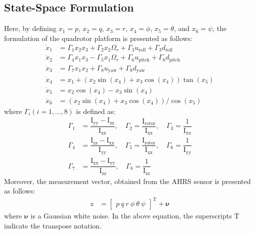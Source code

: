 \documentclass[preprint,12pt,authoryear]{elsarticle}
\begin{document}
\subsection{State-Space Formulation}\label{sec:state-space}
\noindent Here, by defining $x_1 = p$, $x_2 = q$, $x_3 = r$, $x_4 = \phi$, $x_5 = \theta$, and $x_6 = \psi$, the formulation of the quadrotor platform is presented as follows:
\begin{align}\label{eq:diffeq}
	\dot x_1 &= \Gamma_1x_2 x_3 + \Gamma_2 x_2 \Omega_r + \Gamma_3u_{\text{roll}} + \Gamma_3d_{\text{roll}} \\[0.5em]
    \dot x_2 &= \Gamma_4 x_1 x_3 - \Gamma_5 x_1 \Omega_r +  \Gamma_6u_{\text{pitch}} + \Gamma_6d_{\text{pitch}}\\[0.5em] \label{eq:diffeq-mid}
    \dot x_3 &= \Gamma_7x_1 x_2 +  \Gamma_8u_{\text{yaw}} + \Gamma_8d_{\text{yaw}}\\[0.5em] 
    \dot x_4 &= x_1 + (x_2\sin(x_4) + x_3\cos(x_4))\tan(x_5)
    \\[0.5em]
    \dot x_5 &= x_2\cos(x_4) - x_3\sin(x_4)\\[0.5em]
    \dot x_6 &= (x_2\sin(x_4) + x_3\cos(x_4))/\cos(x_5) \label{eq:diffeq-end}
\end{align}
where $\Gamma_i (i = 1, \ldots, 8)$ is defined as:
\begin{equation}
	\begin{split}
		\Gamma_1 &= \dfrac{\mathrm{I}_{\text{yy}} - \mathrm{I}_{\text{zz}}}{\mathrm{I}_{\text{xx}}}, \quad \Gamma_2 = \dfrac{\mathrm{I}_{\text{rotor}}}{\mathrm{I}_{\text{xx}}}, \quad \Gamma_3 = \dfrac{1}{\mathrm{I}_{\text{xx}}}\\ \Gamma_4 &= \dfrac{\mathrm{I}_{\text{zz}} - \mathrm{I}_{\text{xx}}}{\mathrm{I}_{\text{yy}}}, \quad \Gamma_5 = \dfrac{\mathrm{I}_{\text{rotor}}}{\mathrm{I}_{\text{xx}}}, \quad \Gamma_6 = \dfrac{1}{\mathrm{I}_{\text{yy}}} \\ \Gamma_7 &= \dfrac{\mathrm{I}_{\text{xx}} - \mathrm{I}_{\text{yy}}}{\mathrm{I}_{\text{zz}}}, \quad \Gamma_8 = \dfrac{1}{\mathrm{I}_{\text{zz}}}
	\end{split}
\end{equation}
Moreover, the measurement vector, obtained from the AHRS sensor is presented as follows:
\begin{equation}
    \begin{split}
        \boldsymbol{\mathrm{z}} &= \begin{bmatrix}
        p \
        q \
        r \
        \phi \
        \theta \
        \psi
    \end{bmatrix}^\mathrm{T} + \boldsymbol{\nu}
    \end{split}
\end{equation}
where $\boldsymbol{\nu}$ is a Gaussian white noise. In the above equation, the superscripts $\mathrm{T}$ indicate the transpose notation.
\end{document}
